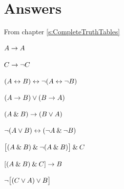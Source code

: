 


\newpage

\section{Answers}
\setcounter{ProbPart}{0}

\problempart
From chapter \ref{s:CompleteTruthTables}
\begin{earg}
\item $A \rightarrow A$ \hfill {}
\item $C \rightarrow{\neg} C$ \hfill {}
\item $(A \leftrightarrow B) \leftrightarrow {\neg}(A\leftrightarrow {\neg} B)$  \hfill {}
\item $(A \rightarrow B) \vee (B \rightarrow A)$  \hfill {}
\item $(A \mathbin{\&} B) \rightarrow (B \vee A)$  \hfill {}
\item ${\neg}(A \vee B) \leftrightarrow ({\neg} A \mathbin{\&} {\neg} B)$ \hfill {}
\item $\bigl[(A\mathbin{\&} B) \mathbin{\&}{\neg}(A\mathbin{\&} B)\bigr] \mathbin{\&} C$  \hfill {}
\item $[(A \mathbin{\&} B) \mathbin{\&} C] \rightarrow B$  \hfill {}
\item ${\neg}\bigl[(C\vee A) \vee B\bigr]$  \hfill {}
\end{earg}


